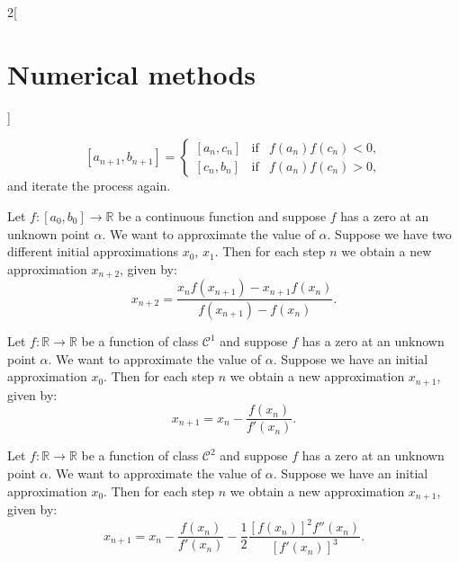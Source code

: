 \documentclass[class=article,10pt,crop=false]{standalone}
\begin{document}
\begin{multicols}{2}[\section{Numerical methods}]
\begin{theorem}
$$[a_{n+1},b_{n+1}]=\left\{\begin{array}{ccc}
    [a_n,c_n] & \text{if} & f(a_n)f(c_n)<0, \\
    \left[c_n,b_n\right] & \text{if} & f(a_n)f(c_n)>0,
\end{array}\right.$$ and iterate the process again.
\end{theorem}
\begin{theorem}
Let $f:[a_0,b_0]\rightarrow\mathbb{R}$ be a continuous function and suppose $f$ has a zero at an unknown point $\alpha$. We want to approximate the value of $\alpha$. Suppose we have two different initial approximations $x_0$, $x_1$. Then for each step $n$ we obtain a new approximation $x_{n+2}$, given by: $$x_{n+2}=\frac{x_nf(x_{n+1})-x_{n+1}f(x_n)}{f(x_{n+1})-f(x_n)}.$$
\end{theorem}
\begin{theorem}
Let $f:\mathbb{R}\rightarrow\mathbb{R}$ be a function of class $\mathcal{C}^1$ and suppose $f$ has a zero at an unknown point $\alpha$. We want to approximate the value of $\alpha$. Suppose we have an initial approximation $x_0$. Then for each step $n$ we obtain a new approximation $x_{n+1}$, given by: $$x_{n+1}=x_n-\frac{f(x_n)}{f'(x_n)}.$$
\end{theorem}
\begin{theorem}
Let $f:\mathbb{R}\rightarrow\mathbb{R}$ be a function of class $\mathcal{C}^2$ and suppose $f$ has a zero at an unknown point $\alpha$. We want to approximate the value of $\alpha$. Suppose we have an initial approximation $x_0$. Then for each step $n$ we obtain a new approximation $x_{n+1}$, given by: $$x_{n+1}=x_n-\frac{f(x_n)}{f'(x_n)}-\frac{1}{2}\frac{\left[f(x_n)\right]^2f''(x_n)}{\left[f'(x_n)\right]^3}.$$
\end{theorem}

\end{multicols}
\end{document}
